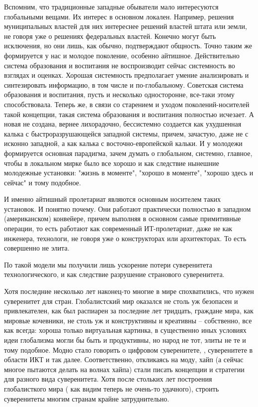 \begin{partbacktext}
Вспомним, что традиционные западные обыватели мало интересуются глобальными вещами. Их интерес в основном локален. Например, решения муниципальных властей для них интереснее решений властей штата или земли, не говоря уже о решениях федеральных властей. Конечно могут быть исключения, но они лишь, как обычно, подтверждают общность. Точно таким же формируется у нас и молодое поколение, особенно айтишное. Действительно система образования и воспитания не воспроизводит сейчас системность во взглядах и оценках. Хорошая системность предполагает умение анализировать и синтезировать информацию, в том числе и по-глобальному. Советская система образования и воспитания, пусть и несколько односторонне, все-таки этому способствовала. Теперь же, в связи со старением и уходом поколений-носителей такой концепции, такая система образования и воспитания полностью исчезает. А новая не создана, вернее лихорадочно, бессистемно создается как ухудшенная калька с быстроразрушающейся западной системы, причем, зачастую, даже не с исконно западной, а как калька с восточно-европейской кальки. И у молодежи формируется основная парадигма, зачем думать о глобальном, системно, главное, чтобы в локальном мирке было все хорошо и как следствие нынешние молодежные установки: "жизнь в моменте"{}, "хорошо в моменте"{}, "хорошо здесь и сейчас"{} и тому подобное.

И именно айтишный пролетариат являются основным носителем таких установок. И понятно почему. Они работают практически полностью в западном (американском) конвейере, причем выполняя в основном самые примитивные операции, то есть работают как современный ИТ-пролетариат, даже не как инженера, технологи, не говоря уже о конструкторах или архитекторах. То есть совершенно не элита.

По такой модели мы получили лишь ускорение потери суверенитета технологического, и как следствие разрушение странового суверенитета.

Хотя последние несколько лет наконец-то многие в мире спохватились, что нужен суверенитет для стран. Глобалистский мир оказался не столь уж безопасен и привлекателен, как был распиарен за последние лет тридцать, граждане мира, как мировые кочевники, не столь уж и конструктивны и креативны -- собственно, все как всегда: хороша только виртуальная картинка, в существенно иных условиях идеи глобализма могли бы быть и продуктивны, но народ не тот, элиты не те и тому подобное. Модно стало говорить о цифровом суверенитете, , суверенитете в области ИКТ и так далее. Соответственно, откликаясь на моду, хайп (а сейчас многое пытаются делать на волнах хайпа) стали писать концепции и стратегии для разного вида суверенитета. Хотя после стольких лет построения глобалисткого мира ( как видим теперь не очень-то удачного), строить суверенитеты многим странам крайне затруднительно.


\end{partbacktext}

